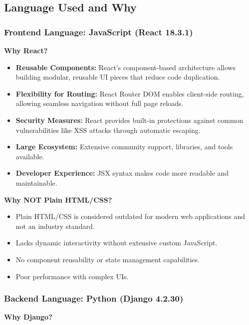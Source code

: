 \documentclass[12pt, a4paper]{article}
\begin{document}
\subsection{Language Used and Why}

\subsubsection{Frontend Language: JavaScript (React 18.3.1)}

\textbf{Why React?}

\begin{itemize}
  \item \textbf{Reusable Components:} React's component-based architecture allows building modular, reusable UI pieces that reduce code duplication.
  \item \textbf{Flexibility for Routing:} React Router DOM enables client-side routing, allowing seamless navigation without full page reloads.
  \item \textbf{Security Measures:} React provides built-in protections against common vulnerabilities like XSS attacks through automatic escaping.
  \item \textbf{Large Ecosystem:} Extensive community support, libraries, and tools available.
  \item \textbf{Developer Experience:} JSX syntax makes code more readable and maintainable.
\end{itemize}

\textbf{Why NOT Plain HTML/CSS?}

\begin{itemize}
  \item Plain HTML/CSS is considered outdated for modern web applications and not an industry standard.
  \item Lacks dynamic interactivity without extensive custom JavaScript.
  \item No component reusability or state management capabilities.
  \item Poor performance with complex UIs.
\end{itemize}

\subsubsection{Backend Language: Python (Django 4.2.30)}

\textbf{Why Django?}
\end{document}

